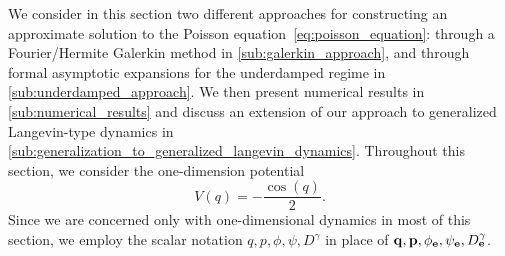 \documentclass[11pt,a4paper]{article}
\begin{document}
We consider in this section two different approaches for constructing an approximate solution to the Poisson equation~\eqref{eq:poisson_equation}:
through a Fourier/Hermite Galerkin method in \cref{sub:galerkin_approach},
and through formal asymptotic expansions for the underdamped regime in \cref{sub:underdamped_approach}.
We then present numerical results in \cref{sub:numerical_results}
and discuss an extension of our approach to generalized Langevin-type dynamics in \cref{sub:generalization_to_generalized_langevin_dynamics}.
Throughout this section, we consider the one-dimension potential
\[
    V(q) = - \frac{\cos(q)}{2}.
\]
Since we are concerned only with one-dimensional dynamics in most of this section,
we employ the scalar notation $q, p, \phi, \psi, D^{\gamma}$ in place of $\boldsymbol{\mathbf q}, \boldsymbol{\mathbf p}, \phi_{\boldsymbol{\mathbf e}}, \psi_{\boldsymbol{\mathbf e}}, D^{\gamma}_{\boldsymbol{\mathbf e}}$.
\end{document}
